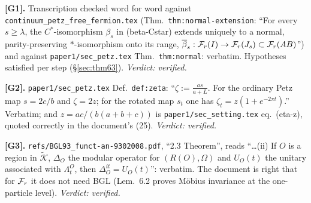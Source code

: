 \documentclass[11pt]{article}
\newcommand{\Fr}{\cF_r}
\theoremstyle{definition}\newtheorem{example}[theorem]{Example}
\begin{document}
\textbf{[G1].}  Transcription checked word for word against
\texttt{continuum\_petz\_free\_fermion.tex} (Thm.~\texttt{thm:normal-extension}: ``For
every $s\ge\lambda$, the $C^*$-isomorphism $\beta_s$ in (beta-Cstar) extends uniquely to a
normal, parity-preserving $*$-isomorphism onto its range,
$\overline\beta_s:\mathcal F_r(I)\to\mathcal F_r(J_s)\subset\mathcal F_r(AB)$'') and against
\texttt{paper1/sec\_petz.tex} Thm.~\texttt{thm:normal}: verbatim.  Hypotheses satisfied per
step (\S\ref{sec:thm63}).  \emph{Verdict: verified.}

\textbf{[G2].}  \texttt{paper1/sec\_petz.tex} Def.~\texttt{def:zeta}: ``$\zeta:=\frac{as}
{a+L}$.  For the ordinary Petz map $s=2c/b$ and $\zeta=2z$; for the rotated map $s_t$ one
has $\zeta_t=z(1+e^{-2\pi t})$.''  Verbatim; and $z=ac/(b(a+b+c))$ is
\texttt{paper1/sec\_setting.tex} eq.~(eta-z), quoted correctly in the document's (25).
\emph{Verdict: verified.}

\textbf{[G3].}  \texttt{refs/BGL93\_funct-an-9302008.pdf}, ``2.3 Theorem'', reads
``\dots (ii) If $O$ is a region in $\widetilde{\mathcal K}$, $\Delta_O$ the modular
operator for $(R(O),\Omega)$ and $U_O(t)$ the unitary associated with $\Lambda^O_t$, then
$\Delta^{it}_O=U_O(t)$'': verbatim.  The document is right that for $\Fr$ it does not
need BGL (Lem.~6.2 proves M\"obius invariance at the one-particle level).
\emph{Verdict: verified.}
\end{document}
